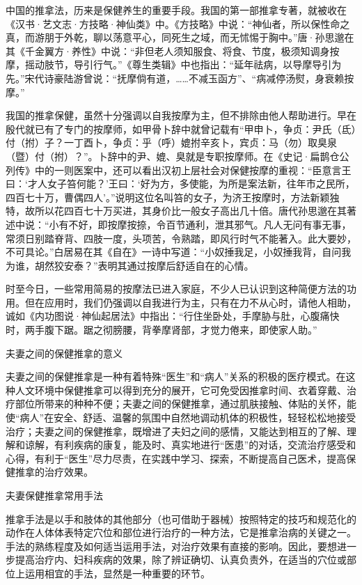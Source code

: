\documentclass[12pt,UTF8]{ctexbook}
\begin{document}
中国的推拿法，历来是保健养生的重要手段。我国的第一部推拿专著，就被收在《汉书·艺文志·方技略·神仙类》中。《方技略》中说：“神仙者，所以保性命之真，而游朋于外乾，聊以荡意平心，同死生之域，而无怵惕于胸中。”唐·孙思邈在其《千金翼方·养性》中说：“非但老人须知服食、将食、节度，极须知调身按摩，摇动肢节，导引行气。”《尊生类辑》中也指出：“延年祛病，以导摩导引为先。”宋代诗豪陆游曾说：“抚摩倘有道，……不减玉函方”、“病减停汤熨，身衰赖按摩。”

我国的推拿保健，虽然十分强调以自我按摩为主，但不排除由他人帮助进行。早在殷代就已有了专门的按摩师，如甲骨卜辞中就曾记载有“甲申卜，争贞：尹氏（氐）付（拊）子？一丁酉卜，争贞：乎（呼）媲拊辛亥卜，宾贞：马（勿）取臭泉（暨）付（拊）？”。卜辞中的尹、媲、臭就是专职按摩师。在《史记·扁鹊仓公列传》中的一则医案中，还可以看出汉初上层社会对保健按摩的重视：“臣意言王曰：‘才人女子笞何能？’王曰：‘好为方，多使能，为所是案法新，往年市之民所，四百七十万，曹偶四人’。”说明这位名叫笞的女子，为济王按摩时，方法新颖独特，故所以花四百七十万买进，其身价比一般女子高出几十倍。唐代孙思邈在其著述中说：“小有不好，即按摩按捺，令百节通利，泄其邪气。凡人无问有事无事，常须日别踏脊背、四肢一度，头项苦，令熟踏，即风行时气不能著入。此大要妙，不可具论。”白居易在其《自在》一诗中写道：“小奴捶我足，小奴捶我背，自问我为谁，胡然狡安泰？”表明其通过按摩后舒适自在的心情。

时至今日，一些常用简易的按摩法已进入家庭，不少人已认识到这种简便方法的功用。但在应用时，我们仍强调以自我进行为主，只有在力不从心时，请他人相助，诚如《内功图说·神仙起居法》中指出：“行住坐卧处，手摩胁与肚，心腹痛快时，两手腹下踞。踞之彻膀腰，背拳摩肾部，才觉力倦来，即使家人助。”





夫妻之间的保健推拿的意义


夫妻之间的保健推拿是一种有着特殊“医生”和“病人”关系的积极的医疗模式。在这种人文环境中保健推拿可以得到充分的展开，它可免受因推拿时间、衣着穿戴、治疗部位所带来的种种不便；夫妻之间的保健推拿，通过肌肤接触、体贴的关怀，能使“病人”在安全、舒适、温馨的氛围中自然地调动机体的积极性，轻轻松松地接受治疗；夫妻之间的保健推拿，既增进了夫妇之间的感情，又能达到相互的了解、理解和谅解，有利疾病的康复，能及时、真实地进行“医患”的对话，交流治疗感受和心得，有利于“医生”尽力尽责，在实践中学习、探索，不断提高自己医术，提高保健推拿的治疗效果。





夫妻保健推拿常用手法


推拿手法是以手和肢体的其他部分（也可借助于器械）按照特定的技巧和规范化的动作在人体体表特定穴位和部位进行治疗的一种方法，它是推拿治病的关键之一。手法的熟练程度及如何适当运用手法，对治疗效果有直接的影响。因此，要想进一步提高治疗内、妇科疾病的效果，除了辨证确切、认真负责外，在适当的穴位或部位上运用相宜的手法，显然是一种重要的环节。
\end{document}
